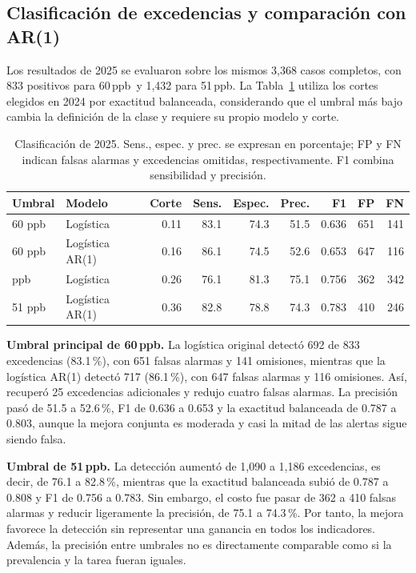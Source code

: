 \documentclass[11pt,letterpaper]{article}
\newcommand{\ppb}{\,ppb}
\begin{document}
\subsection{Clasificación de excedencias y comparación con AR(1)}
Los resultados de 2025 se evaluaron sobre los mismos 3,368 casos completos, con 833 positivos para 60\ppb\ y 1,432 para 51\ppb. La Tabla~\ref{tab:clasificacion} utiliza los cortes elegidos en 2024 por exactitud balanceada, considerando que el umbral más bajo cambia la definición de la clase y requiere su propio modelo y corte.

\begin{table}[!htbp]\centering\small
\begin{tabular}{@{}llrrrrrrr@{}}
\toprule
Umbral & Modelo & Corte & Sens. & Espec. & Prec. & F1 & FP & FN \\
\midrule
60 ppb & Logística & 0.11 & 83.1 & 74.3 & 51.5 & 0.636 & 651 & 141 \\
60 ppb & Logística AR(1) & 0.16 & 86.1 & 74.5 & 52.6 & 0.653 & 647 & 116 \\
\addlinespace
51 ppb & Logística & 0.26 & 76.1 & 81.3 & 75.1 & 0.756 & 362 & 342 \\
51 ppb & Logística AR(1) & 0.36 & 82.8 & 78.8 & 74.3 & 0.783 & 410 & 246 \\
\bottomrule
\end{tabular}
\caption{Clasificación de 2025. Sens., espec. y prec. se expresan en porcentaje; FP y FN indican falsas alarmas y excedencias omitidas, respectivamente. F1 combina sensibilidad y precisión.}\label{tab:clasificacion}
\end{table}

\textbf{Umbral principal de 60\ppb.} La logística original detectó 692 de 833 excedencias (83.1\,\%), con 651 falsas alarmas y 141 omisiones, mientras que la logística AR(1) detectó 717 (86.1\,\%), con 647 falsas alarmas y 116 omisiones. Así, recuperó 25 excedencias adicionales y redujo cuatro falsas alarmas. La precisión pasó de 51.5 a 52.6\,\%, F1 de 0.636 a 0.653 y la exactitud balanceada de 0.787 a 0.803, aunque la mejora conjunta es moderada y casi la mitad de las alertas sigue siendo falsa.

\textbf{Umbral de 51\ppb.} La detección aumentó de 1,090 a 1,186 excedencias, es decir, de 76.1 a 82.8\,\%, mientras que la exactitud balanceada subió de 0.787 a 0.808 y F1 de 0.756 a 0.783. Sin embargo, el costo fue pasar de 362 a 410 falsas alarmas y reducir ligeramente la precisión, de 75.1 a 74.3\,\%. Por tanto, la mejora favorece la detección sin representar una ganancia en todos los indicadores. Además, la precisión entre umbrales no es directamente comparable como si la prevalencia y la tarea fueran iguales.
\end{document}
